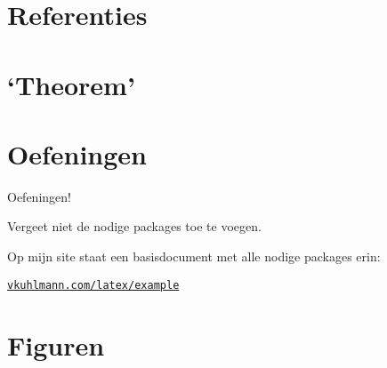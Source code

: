 \documentclass[
    dutch,
    everyoneauthor=true,
    defaultSlideCollection=vincent,
]{../../cursuspresentatie}
\let\placetarget\relax
\let\placetarget\relax
\begin{document}


\section{Referenties}\label{sec:referenties}

\def\placetarget{\hypertarget{referenties}{}}


\section{`Theorem'}\label{sec:theorem}

\def\placetarget{\hypertarget{theorem}{}}


\section{Oefeningen}\label{sec:oefeningen1}

\def\placetarget{\hypertarget{oefeningen1}{}}

\begin{frame}
    \begin{center}
        {\LARGE Oefeningen!}
        \vspace{30pt}

        Vergeet niet de nodige packages toe te voegen.
        
        Op mijn site
        staat een basisdocument met alle nodige packages erin:

        \href{https://vkuhlmann.com/latex/example}{\nolinkurl{vkuhlmann.com/latex/example}}
    \end{center}
\end{frame}



\section{Figuren}\label{sec:figuren}
\end{document}
